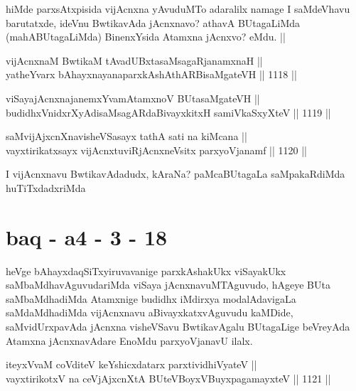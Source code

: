 \begin{artha}
hiMde parxsAtxpisida vijAcnxna yAvuduMTo adaralilx namage I saMdeVhavu barutatxde, ideVnu BwtikavAda jAcnxnavo? athavA BUtagaLiMda (mahABUtagaLiMda) BinenxYsida Atamxna jAcnxvo? eMdu. ||
\end{artha}


\begin{shl}
vijAcnxnaM BwtikaM tAvadUBxtasaMsagaRjanamxnaH || \\
yatheYvarx bAhayxnayanaparxkAshAthARBisaMgateVH ||  1118 ||  
\end{shl}
				
\begin{shl}
viSayajAcnxnajanemxYvamAtamxnoV BUtasaMgateVH || \\
budidhxVnidxrXyAdisaMsagARdaBivayxkitxH samiVkaSxyXteV ||  1119 || 
\end{shl}
				
\begin{shl}
saMvijAjxcnXnavisheVSasayx tathA sati na kiMcana || \\
vayxtirikatxsayx vijAcnxtuviRjAcnxneV\s sitx parxyoVjanamf ||  1120 ||  
\end{shl}

\begin{artha}
I vijAcnxnavu BwtikavAdadudx, kAraNa? paMcaBUtagaLa saMpakaRdiMda huTiTxdadxriMda
\end{artha}

\section*{baq - a4 - 3 - 18}


\begin{artha}
heVge bAhayxdaqSiTxyiruvavanige parxkAshakUkx viSayakUkx saMbaMdhavAguvudariMda viSaya jAcnxnavuMTAguvudo, hAgeye BUta saMbaMdhadiMda Atamxnige budidhx iMdirxya modalAdavigaLa saMdaMdhadiMda vijAcnxnavu aBivayxkatxvAguvudu kaMDide, saMvidUrxpavAda jAcnxna visheVSavu BwtikavAgalu BUtagaLige beVreyAda Atamxna jAcnxnavAdare EnoMdu parxyoVjanavU ilalx.
\end{artha}


\begin{shl}
iteyxVvaM coVditeV keYshicxdatarx parxtividhiVyateV || \\
vayxtirikotxV na ceVjAjxcnXtA BUteVBoyxV\s BuyxpagamayxteV ||  1121 ||  
\end{shl}


